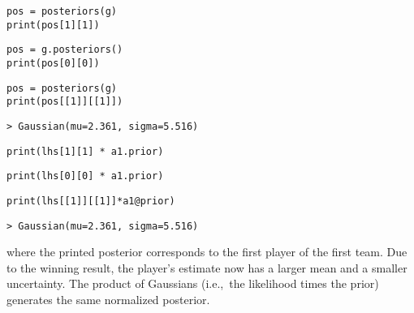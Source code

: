 \documentclass[article]{jss}
\begin{document}
\begin{paracol}{3}
\begin{lstlisting}[backgroundcolor=\color{julia!60}, belowskip=-0.77 \baselineskip]
pos = posteriors(g)
print(pos[1][1])
\end{lstlisting}
  \switchcolumn
\begin{lstlisting}[backgroundcolor=\color{python!60}, belowskip=-0.77 \baselineskip]
pos = g.posteriors()
print(pos[0][0])
\end{lstlisting}
   \switchcolumn
\begin{lstlisting}[backgroundcolor=\color{r!50}, belowskip=-0.77 \baselineskip]
pos = posteriors(g)
print(pos[[1]][[1]])
\end{lstlisting}  
\end{paracol}
\begin{lstlisting}[backgroundcolor=\color{all}, belowskip=-0.77 \baselineskip]
> Gaussian(mu=2.361, sigma=5.516)
\end{lstlisting}
\begin{paracol}{3}
\begin{lstlisting}[backgroundcolor=\color{julia!60}, belowskip=-0.77 \baselineskip]
print(lhs[1][1] * a1.prior)
\end{lstlisting}
  \switchcolumn
\begin{lstlisting}[backgroundcolor=\color{python!60}, belowskip=-0.77 \baselineskip]
print(lhs[0][0] * a1.prior)
\end{lstlisting}
   \switchcolumn
\begin{lstlisting}[backgroundcolor=\color{r!50}, belowskip=-0.77 \baselineskip]
print(lhs[[1]][[1]]*a1@prior)
\end{lstlisting}  
\end{paracol}
\begin{lstlisting}[captionpos=b,backgroundcolor=\color{all},label=lst:game_posterior, caption={Posteriors query and their manual computation.},belowskip=0cm]
> Gaussian(mu=2.361, sigma=5.516)
\end{lstlisting}
%
where the printed posterior corresponds to the first player of the first team. 
Due to the winning result, the player's estimate now has a larger mean and a smaller uncertainty. 
The product of Gaussians (i.e.,~the likelihood times the prior) generates the same normalized posterior. 

\end{document}

